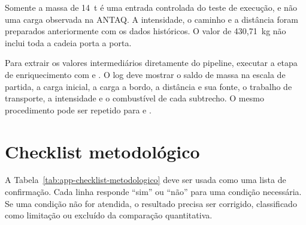 Somente a massa de 14~t é uma entrada controlada do teste de execução, e não uma carga observada na ANTAQ. A intensidade, o caminho e a distância foram preparados anteriormente com os dados históricos. O valor de 430,71~kg não inclui toda a cadeia porta a porta.

Para extrair os valores intermediários diretamente do pipeline, executar a etapa de enriquecimento com  e . O log deve mostrar o saldo de massa na escala de partida, a carga inicial, a carga a bordo, a distância e sua fonte, o trabalho de transporte, a intensidade e o combustível de cada subtrecho. O mesmo procedimento pode ser repetido para  e .

\section{Checklist metodológico}
\label{sec:app-checklist-metodologico}

A Tabela~\ref{tab:app-checklist-metodologico} deve ser usada como uma lista de confirmação. Cada linha responde ``sim'' ou ``não'' para uma condição necessária. Se uma condição não for atendida, o resultado precisa ser corrigido, classificado como limitação ou excluído da comparação quantitativa.

